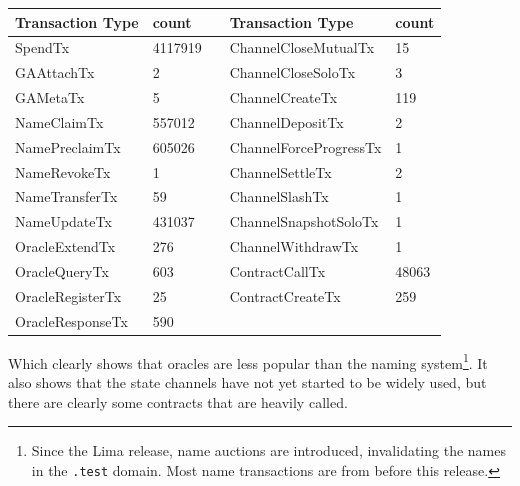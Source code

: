 \begin{center}
\begin{tabular}{l|lcl|l}
        Transaction Type     &  count  & \vspace{2mm} & Transaction Type     &  count  \\
  \hline
  SpendTx      &  4117919  &  & ChannelCloseMutualTx   &      15  \\
 GAAttachTx             &       2  &  & ChannelCloseSoloTx     &      3  \\
 GAMetaTx               &       5  &  & ChannelCreateTx        &    119  \\
 NameClaimTx            &  557012  & & ChannelDepositTx       &       2  \\
 NamePreclaimTx         &  605026  & & ChannelForceProgressTx &       1  \\
 NameRevokeTx           &      1  & & ChannelSettleTx        &       2  \\
  NameTransferTx         &      59  & & ChannelSlashTx         &       1  \\
  NameUpdateTx           & 431037  & & ChannelSnapshotSoloTx  &       1  \\
  OracleExtendTx        &     276  & &  ChannelWithdrawTx      &       1  \\
  OracleQueryTx          &     603  & &  ContractCallTx         &   48063  \\
  OracleRegisterTx       &      25  && ContractCreateTx       &     259  \\
 OracleResponseTx       &     590  \\
\end{tabular}
\end{center}

 Which clearly shows that oracles are less popular than the naming system\footnote{Since the Lima release, name auctions are introduced, invalidating the names in the \texttt{.test} domain. Most name transactions are from before this release.}. It also shows that the state channels have not yet started to be widely used, but there are clearly some contracts that are heavily called.
